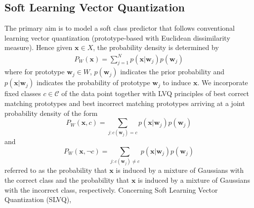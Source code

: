 \documentclass[english]{HSMW-Thesis}
\begin{document}
\subsection{Soft Learning Vector Quantization}
The primary aim is to model a soft class predictor that follows conventional learning vector quantization (prototype-based with Euclidean dissimilarity measure)\cite{seo2003soft,villmann2018probabilistic,kaden2014aspects}. Hence given\hspace{2pt} $\mathbf{x}\in X$,\hspace{2pt} the probability density is determined by 
\begin{align}
	P_{W}\left( \mathbf{x}\right) = \sum_{j=1}^{N}p\left( \mathbf{x}|\mathbf{w}_{j}\right)p\left( \mathbf{w}_{j}\right) 
\end{align}
where for prototype \hspace{2pt}$\mathbf{w}_{j}\in W$,\hspace{2pt} $p\left( \mathbf{w}_{j}\right)$\hspace{2pt} indicates the prior probability and\hspace{2pt} $p\left( \mathbf{x}|\mathbf{w}_{j}\right)$\hspace{2pt} indicates the probability of prototype\hspace{2pt} $\mathbf{w}_{j}$\hspace{2pt} to induce\hspace{2pt} $ \mathbf{x}$. 
We incorporate fixed classes\hspace{2pt} $c\in\mathcal{C}$ \hspace{2pt} of the data point together with LVQ principles of best correct matching prototypes and best incorrect matching prototypes arriving at a joint probability density of the form
\begin{equation}
	P_{W}\left( \mathbf{x},c\right) = \sum_{j:c\left( \mathbf{w}_{j}\right) = c}p\left( \mathbf{x}|\mathbf{w}_{j}\right)p\left( \mathbf{w}_{j}\right)
\end{equation}
and 
\begin{equation}
	P_{W}\left( \mathbf{x},\neg c\right) = \sum_{j:c\left( \mathbf{w}_{j}\right) \neq c}p\left( \mathbf{x}|\mathbf{w}_{j}\right)p\left( \mathbf{w}_{j}\right)	
\end{equation}
referred to as the probability that\hspace{2pt} $\mathbf{x}$\hspace{2pt} is induced by a mixture of Gaussians with the correct class and the probability that\hspace{2pt} $\mathbf{x}$\hspace{2pt} is induced by a mixture of Gaussians with the incorrect class, respectively\cite{seo2003soft,villmann2018probabilistic}. Concerning Soft Learning Vector Quantization (SLVQ), 
\end{document}
